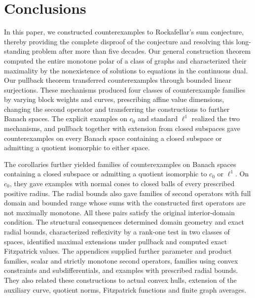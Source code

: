 \documentclass[11pt]{article}
\theoremstyle{definition}
\theoremstyle{remark}
\begin{document}
\section{Conclusions}
\label{sec:conclusion}



In this paper, we constructed counterexamples to Rockafellar's sum conjecture, thereby providing the complete disproof of the conjecture and resolving this long-standing problem after more than five decades. Our general construction theorem computed the entire monotone polar of a class of graphs and characterized their maximality by the nonexistence of solutions to equations in the continuous dual. Our pullback theorem transferred counterexamples through bounded linear surjections. These mechanisms produced four classes of counterexample families by varying block weights and curves, prescribing affine value dimensions, changing the second operator and transferring the constructions to further Banach spaces. The explicit examples on $c_0$ and standard $\ell^1$ realized the two mechanisms, and pullback together with extension from closed subspaces gave counterexamples on every Banach space containing a closed subspace or admitting a quotient isomorphic to either space.
 
The corollaries further yielded families of counterexamples on Banach spaces containing a closed subspace or admitting a quotient isomorphic to $c_0$ or $\ell^1$. On $c_0$, they gave examples with normal cones to closed balls of every prescribed positive radius. The radial bounds also gave families of second operators with full domain and bounded range whose sums with the constructed first operators are not maximally monotone. All these pairs satisfy the original interior-domain condition.
The structural consequences determined domain geometry and exact radial bounds, characterized reflexivity by a rank-one test in two classes of spaces, identified maximal extensions under pullback and computed exact Fitzpatrick values. The appendices supplied further parameter and product families, scalar and strictly monotone second operators, families using convex constraints and subdifferentials, and examples with prescribed radial bounds. They also related these constructions to actual convex hulls, extension of the auxiliary curve, quotient norms, Fitzpatrick functions and finite graph averages. 
\end{document}

